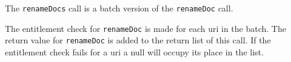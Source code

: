 The \verb+renameDocs+ call is a batch version of the \verb+renameDoc+ call.

The entitlement check for \verb+renameDoc+ is made for each uri in the batch. The
return value for \verb+renameDoc+ is added to the return list of this call. If
the entitlement check fails for a uri a null will occupy its place in the list.

